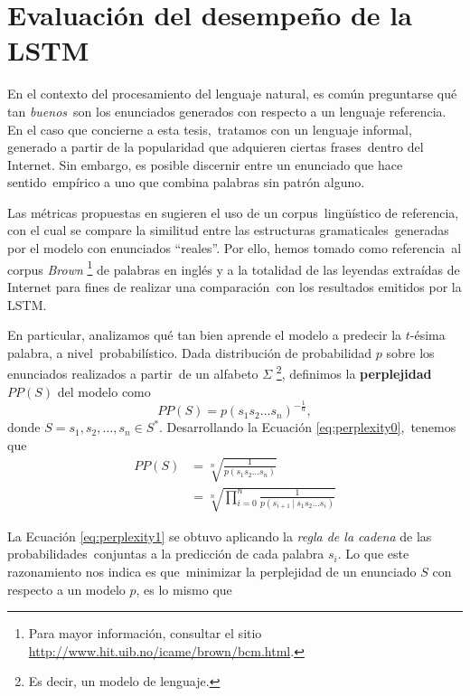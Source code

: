 \section{Evaluación del desempeño de la LSTM} \label{sec:metrics}

\noindent
En el contexto del procesamiento del lenguaje natural, es común preguntarse qué tan \emph{buenos}\
son los enunciados generados con respecto a un lenguaje referencia. En el caso que concierne a esta tesis,\
tratamos con un lenguaje informal, generado a partir de la popularidad que adquieren ciertas frases\
dentro del Internet. Sin embargo, es posible discernir entre un enunciado que hace sentido\
empírico a uno que combina palabras sin patrón alguno.\par
Las métricas propuestas en \cite{DBLP:journals/corr/VinyalsTBE16} sugieren el uso de un corpus\
lingüístico de referencia, con el cual se compare la similitud entre las estructuras gramaticales\
generadas por el modelo con enunciados ``reales''. Por ello, hemos tomado como referencia\
al corpus \emph{Brown}%
\footnote{
  Para mayor información, consultar el sitio \url{http://www.hit.uib.no/icame/brown/bcm.html}.
} de palabras en inglés y a la totalidad de las leyendas extraídas de Internet para fines de realizar una comparación\
con los resultados emitidos por la LSTM.\par
En particular, analizamos qué tan bien aprende el modelo a predecir la $t$-ésima palabra, a nivel\
probabilístico. Dada distribución de probabilidad $p$ sobre los enunciados realizados a partir\
de un alfabeto $\Sigma$%
\footnote{
  Es decir, un modelo de lenguaje.
}, definimos la \textbf{perplejidad} $PP(S)$ del modelo como
\begin{equation}
  PP(S) = p(s_1 s_2 \ldots s_n) ^{-\frac{1}{n}}, \label{eq:perplexity0}
\end{equation}
donde $S = s_1, s_2, \ldots, s_n \in S^*$. Desarrollando la Ecuación \ref{eq:perplexity0},\
tenemos que
\begin{align}
  PP(S) &= \sqrt[n]{\frac{1}{p(s_1 s_2 \ldots s_n)}}\\
  &= \sqrt[n]{\prod_{i=0}^n \frac{1}{p(s_{i+1}\ |\ s_1 s_2 \ldots s_i)}} \label{eq:perplexity1}
\end{align}\par
La Ecuación \ref{eq:perplexity1} se obtuvo aplicando la \emph{regla de la cadena} de las probabilidades\
conjuntas a la predicción de cada palabra $s_i$. Lo que este razonamiento nos indica es que\
minimizar la perplejidad de un enunciado $S$ con respecto a un modelo $p$, es lo mismo que\
